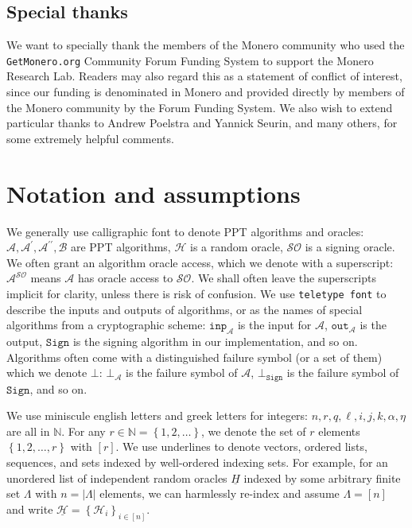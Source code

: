 \documentclass{mrl}
\theoremstyle{definition}
\numberwithin{theorem}{subsection}
\newcommand{\adversary}{\mathcal{A}}
\newcommand{\bbn}{\mathbb{N}}
\begin{document}
\subsection{Special thanks} 

We want to specially thank the members of the Monero community who used the \texttt{GetMonero.org} Community Forum Funding System to support the Monero Research Lab. Readers may also regard this as a statement of conflict of interest, since our funding is denominated in Monero and provided directly by members of the Monero community by the Forum Funding System. We also wish to extend particular thanks to Andrew Poelstra and Yannick Seurin, and many others, for some extremely helpful comments.


\section{Notation and assumptions}\label{notation}

We generally use calligraphic font to denote PPT algorithms and oracles: $\adversary, \adversary^\prime, \adversary^{\prime \prime}, \mathcal{B}$ are PPT algorithms, $\mathcal{H}$ is a random oracle, $\mathcal{SO}$ is a signing oracle. We often grant an algorithm oracle access, which we denote with a superscript: $\mathcal{A}^{\mathcal{SO}}$ means $\mathcal{A}$ has oracle access to $\mathcal{SO}$. We shall often leave the superscripts implicit for clarity, unless there is risk of confusion. We use \texttt{teletype font} to describe the inputs and outputs of algorithms, or as the names of special algorithms from a cryptographic scheme: $\texttt{inp}_\adversary$ is the input for $\adversary$, $\texttt{out}_\adversary$ is the output, $\texttt{Sign}$ is the signing algorithm in our implementation, and so on. Algorithms often come with a distinguished failure symbol (or a set of them) which we denote $\bot$: $\bot_\adversary$ is the failure symbol of $\adversary$, $\bot_{\texttt{Sign}}$ is the failure symbol of $\texttt{Sign}$, and so on.

We use miniscule english letters and greek letters for integers: $n, r, q, \ell, i, j, k, \alpha, \eta$ are all in $\bbn$. For any $r \in \bbn = \left\{1, 2, \ldots\right\}$, we denote the set of $r$ elements $\left\{1, 2, \ldots, r\right\}$ with $\left[r\right]$. We use underlines to denote vectors, ordered lists, sequences, and sets indexed by well-ordered indexing sets. For example, for an unordered list of independent random oracles $\underline{H}$ indexed by some arbitrary finite set $\Lambda$ with $n = \left|\Lambda\right|$ elements, we can harmlessly re-index and assume $\Lambda = [n]$ and write $\underline{\mathcal{H}} = \left\{\mathcal{H}_i\right\}_{i \in [n]}$. 
\end{document}
